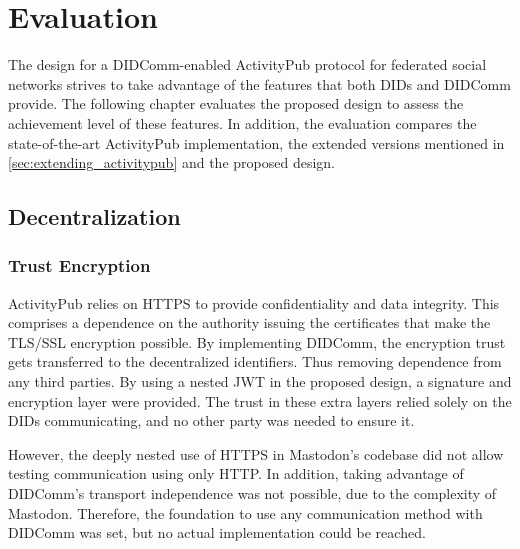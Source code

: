 \chapter{Evaluation}
\label{cha:evaluation}

The design for a DIDComm-enabled ActivityPub protocol for federated social networks strives to take advantage of the features that both DIDs and DIDComm provide. The following chapter evaluates the proposed design to assess the achievement level of these features. In addition, the evaluation compares the state-of-the-art ActivityPub implementation, the extended versions mentioned in \ref{sec:extending_activitypub} and the proposed design.

\section{Decentralization}
\subsection{Trust Encryption}
ActivityPub relies on HTTPS to provide confidentiality and data integrity. This comprises a dependence on the authority issuing the certificates that make the TLS/SSL encryption possible. By implementing DIDComm, the encryption trust gets transferred to the decentralized identifiers. Thus removing dependence from any third parties. By using a nested JWT in the proposed design, a signature and encryption layer were provided. The trust in these extra layers relied solely on the DIDs communicating, and no other party was needed to ensure it. 

However, the deeply nested use of HTTPS in Mastodon's codebase did not allow testing communication using only HTTP. In addition, taking advantage of DIDComm's transport independence was not possible, due to the complexity of Mastodon. Therefore, the foundation to use any communication method with DIDComm was set, but no actual implementation could be reached.
 

